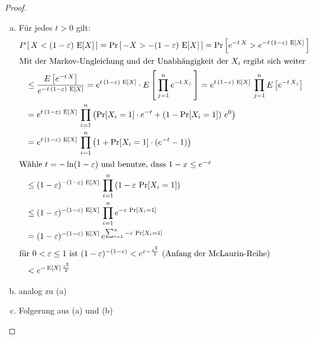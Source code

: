 \begin{proof}
	\begin{enumerate}[(a)]
		\item Für jedes $t > 0$ gilt:
			\begin{align*}
			  P&\left[\,X < (1-\varepsilon)\,\operatorname{E}[X]\,\right] =
			  \Pr\left[\,-X > -(1-\varepsilon)\,\operatorname{E}[X]\,\right] =
			  \Pr\left[e^{-t\,X}>e^{-t\,(1-\varepsilon)\,\operatorname{E}[X]}\,\right]\\
			  \intertext{Mit der Markov-Ungleichung und der
			  Unabhängigkeit der $X_i$ ergibt sich weiter}
			  &\leq
			  \frac{E\left[e^{-t\,X}\right]}{e^{-t\,(1-\varepsilon)\,\operatorname{E}[X]}}
			  = e^{t\,(1-\varepsilon)\,\operatorname{E}[X]}\cdot
			  E\left[\,\prod_{j=1}^{n} e^{-t\,X_j}\,\right] =
			  e^{t\,(1-\varepsilon)\,\operatorname{E}[X]}\,\prod_{j=1}^{n}
			  E\left[e^{-t\,X_j}\right]\\
			  &= e^{t\,(1-\varepsilon)\,\operatorname{E}[X]}\,\prod_{i=1}^{n}
			  \left(\Pr[X_i=1]\cdot e^{-t} +
			  \left(1-\Pr[X_i=1]\right)\, e^0\right) \\
			  &= e^{t\,(1-\varepsilon)\,\operatorname{E}[X]}\,\prod_{i=1}^{n}
			  \left(1 + \Pr[X_i=1]\cdot(e^{-t} - 1)\right) \\
			  \intertext{Wähle $t=-\ln(1-\varepsilon)$ und benutze,
			  dass $1-x\leq e^{-x}$}
			  &\leq (1-\varepsilon)^{-(1-\varepsilon)\,\operatorname{E}[X]}\,
			  \prod_{i=1}^{n}\left(1-\varepsilon\,\Pr[X_i=1]\right) \\
			  &\leq (1-\varepsilon)^{-(1-\varepsilon)\,\operatorname{E}[X]}\,
			  \prod_{i=1}^{n} e^{-\varepsilon\,\Pr[X_i=1]} \\
			  &= (1-\varepsilon)^{-(1-\varepsilon)\,\operatorname{E}[X]}\,
			  e^{\sum_{i=1}^{n} -\varepsilon\,\Pr[X_i=1]} \\
			  \intertext{für $0<\varepsilon\leq 1$ ist
			  $(1-\varepsilon)^{-(1-\varepsilon)} < e^{\varepsilon
			  - \frac{\varepsilon^2}{2}}$ (Anfang der
			  McLaurin-Reihe)}
			  &< e^{-\operatorname{E}[X]\,\frac{\varepsilon^2}{2}}
			\end{align*}
		\item analog zu (a)
		\item Folgerung aus (a) und (b)
	\end{enumerate}
\end{proof}
